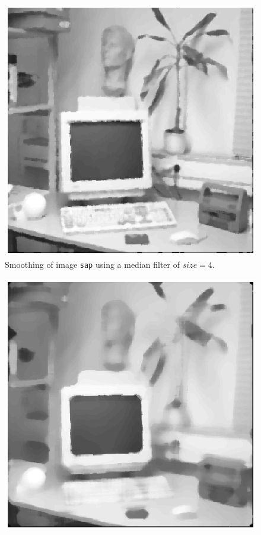 \begin{minipage}{\linewidth}
  \begin{minipage}{0.4\linewidth}
    \begin{figure}[H]
      \includegraphics[scale=0.6]{./images/Q17/medfilt/sap_4.eps}
      \caption{Smoothing of image \texttt{sap} using a median filter of $size=4$.}
      \label{fig:Q17_medfilt_sap_4}
    \end{figure}
  \end{minipage}
  \hspace{0.05\linewidth}
  \begin{minipage}{0.4\linewidth}
    \begin{figure}[H]
      \includegraphics[scale=0.6]{./images/Q17/medfilt/sap_10.eps}

\end{figure}
\end{minipage}
\end{minipage}
